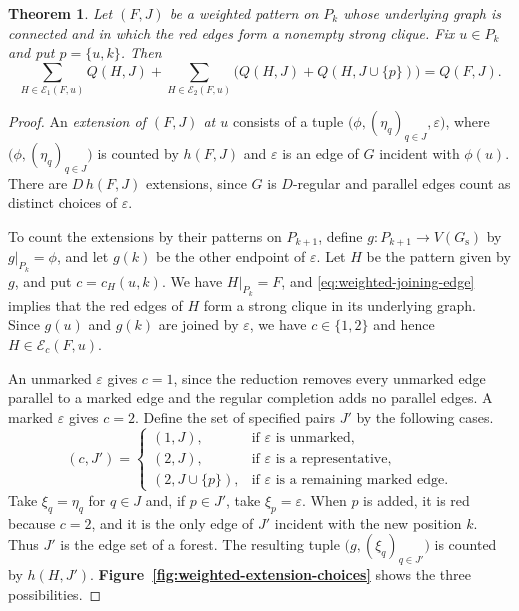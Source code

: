 \documentclass[preprint,11pt,numbers]{elsarticle-arxiv}
\numberwithin{equation}{section}
\newtheorem{theorem}{Theorem}[section]
\theoremstyle{definition}
\begin{document}
\begin{theorem}\label{thm:weighted-extension}
Let $(F,J)$ be a weighted pattern on $P_k$ whose underlying
graph is connected and in which the red edges form a nonempty
strong clique. Fix $u\in P_k$ and put $p=\{u,k\}$. Then
\begin{equation}\label{eq:weighted-extension}
 \sum_{H\in\mathcal E_1(F,u)}Q(H,J)
 +\sum_{H\in\mathcal E_2(F,u)}
    \bigl(Q(H,J)+Q(H,J\cup\{p\})\bigr)=Q(F,J).
\end{equation}
\end{theorem}

\begin{proof}
An \emph{extension of $(F,J)$ at $u$} consists of a tuple
$\bigl(\phi,(\eta_q)_{q\in J},\varepsilon\bigr)$, where
$\bigl(\phi,(\eta_q)_{q\in J}\bigr)$ is counted by $h(F,J)$ and
$\varepsilon$ is an edge of $G$ incident with $\phi(u)$.
There are $D\,h(F,J)$ extensions, since $G$ is $D$-regular and
parallel edges count as distinct choices of $\varepsilon$.

To count the extensions by their patterns on $P_{k+1}$, define
$g\colon P_{k+1}\to V(G_{\mathrm s})$ by $g|_{P_k}=\phi$, and
let $g(k)$ be the other endpoint of $\varepsilon$. Let $H$ be
the pattern given by $g$, and put $c=c_H(u,k)$. We have
$H|_{P_k}=F$, and \eqref{eq:weighted-joining-edge} implies that the
red edges of $H$ form a strong clique in its underlying graph.
Since $g(u)$ and $g(k)$ are joined by $\varepsilon$, we have
$c\in\{1,2\}$ and hence $H\in\mathcal E_c(F,u)$.

An unmarked $\varepsilon$ gives $c=1$, since the reduction removes
every unmarked edge parallel to a marked edge and the regular
completion adds no parallel edges. A marked $\varepsilon$ gives
$c=2$. Define the set of specified pairs $J'$ by the following cases.
\[
 (c,J')=
 \begin{cases}
 (1,J),&\text{if $\varepsilon$ is unmarked},\\
 (2,J),&\text{if $\varepsilon$ is a representative},\\
 (2,J\cup\{p\}),&\text{if $\varepsilon$ is a remaining marked edge}.
 \end{cases}
\]
Take $\xi_q=\eta_q$ for $q\in J$ and, if $p\in J'$, take
$\xi_p=\varepsilon$. When $p$ is added, it is red because $c=2$,
and it is the only edge of $J'$ incident with the new position $k$.
Thus $J'$ is the edge set of a forest. The resulting tuple
$\bigl(g,(\xi_q)_{q\in J'}\bigr)$ is counted by $h(H,J')$.
\textbf{Figure~\ref{fig:weighted-extension-choices}} shows the
three possibilities.


\end{proof}
\end{document}
